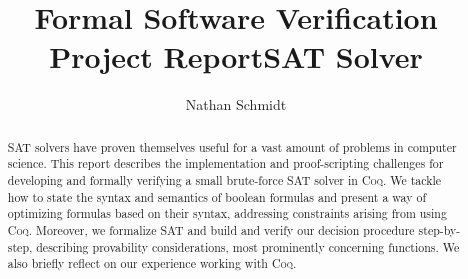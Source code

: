 \documentclass[runningheads]{llncs}
\begin{document}
\renewcommand{\lstlistingname}{List.}
\renewcommand{\thelstlisting}{\arabic{lstlisting}}
%
\title{Formal Software Verification Project Report\newline{}SAT Solver}
%
%
\author{Nathan Schmidt}
%
%
%
\maketitle              %
%
\begin{abstract}
SAT solvers have proven themselves useful for a vast amount of problems in computer science. 
This report describes the implementation and proof-scripting challenges for developing and formally verifying a small brute-force SAT solver in \textsc{Coq}. 
We tackle how to state the syntax and semantics of boolean formulas and present a way of optimizing formulas based on their syntax, addressing constraints arising from using \textsc{Coq}. 
Moreover, we formalize SAT and build and verify our decision procedure step-by-step, describing provability considerations, most prominently concerning functions. 
We also briefly reflect on our experience working with \textsc{Coq}.
\end{abstract}
%
%
%





\printbibliography{}
\end{document}
